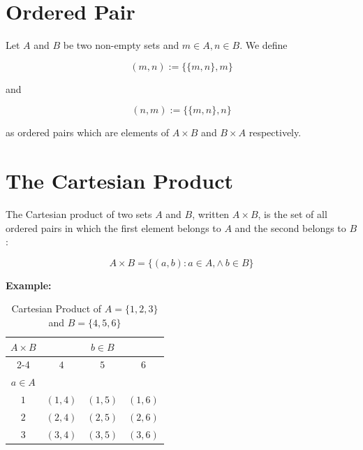 \QED

\section{Ordered Pair}

Let \(A\) and \(B\) be two non-empty sets and \(m \in A, n \in B\). We define

\[
	(m,n) := \{\{m, n\}, {m}\}
\]

and

\[
	(n,m) := \{\{m, n\}, {n}\}
\]

as ordered pairs which are elements of \(A \times B\) and \(B \times A\) respectively.

\section{The Cartesian Product}

The Cartesian product of two sets \(A\) and \(B\), written \(A \times B\), is the set of
all ordered pairs in which the first element belongs to \(A\) and the second belongs to \(B\):

\[
	A \times B = \{ (a, b) : a \in A, \land\ b \in B\}
\]

\textbf{Example:}

\begin{table}[H]
	\centering
	\caption{Cartesian Product of \(A = \{1, 2, 3\}\) and \(B = \{4, 5, 6\}\)}
	\begin{tabular}{|c|c|c|c|}
		\hline
		\multirow{3}{*}{\(A \times B\)} & \multicolumn{3}{c|}{\(b \in B\)}                           \\
		\cline{2-4}
		                                & \(4\)                            & \(5\)      & \(6\)      \\
		\hline
		\(a \in A\)                     &                                  &            &            \\
		\hline
		\(1\)                           & \((1, 4)\)                       & \((1, 5)\) & \((1, 6)\) \\
		\hline
		\(2\)                           & \((2, 4)\)                       & \((2, 5)\) & \((2, 6)\) \\
		\hline
		\(3\)                           & \((3, 4)\)                       & \((3, 5)\) & \((3, 6)\) \\
		\hline
	\end{tabular}
	\label{tab:cartesian_product}
\end{table}

